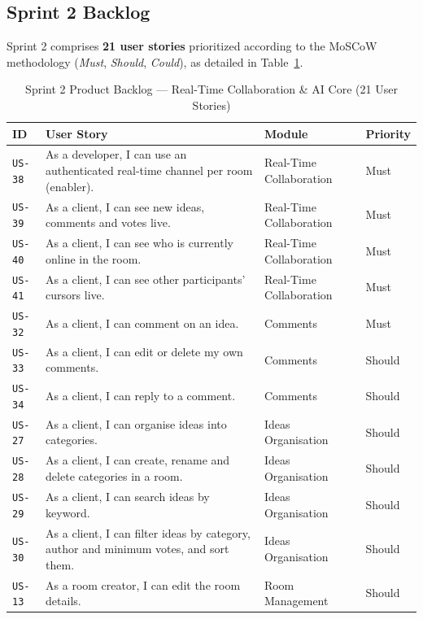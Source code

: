 \subsection{Sprint 2 Backlog}

Sprint 2 comprises \textbf{21 user stories} prioritized according to the MoSCoW methodology (\textit{Must}, \textit{Should}, \textit{Could}), as detailed in Table~\ref{tab:sprint2-backlog}.

\begin{table}[htbp]
\centering
\caption{Sprint 2 Product Backlog — Real-Time Collaboration \& AI Core (21 User Stories)}
\label{tab:sprint2-backlog}
\small
\begin{tabularx}{\textwidth}{@{} l X l l @{}}
\toprule
\textbf{ID} & \textbf{User Story} & \textbf{Module} & \textbf{Priority} \\
\midrule
\texttt{US-38} & As a developer, I can use an authenticated real-time channel per room (enabler). & Real-Time Collaboration & Must \\
\texttt{US-39} & As a client, I can see new ideas, comments and votes live. & Real-Time Collaboration & Must \\
\texttt{US-40} & As a client, I can see who is currently online in the room. & Real-Time Collaboration & Must \\
\texttt{US-41} & As a client, I can see other participants' cursors live. & Real-Time Collaboration & Must \\
\midrule
\texttt{US-32} & As a client, I can comment on an idea. & Comments & Must \\
\texttt{US-33} & As a client, I can edit or delete my own comments. & Comments & Should \\
\texttt{US-34} & As a client, I can reply to a comment. & Comments & Should \\
\midrule
\texttt{US-27} & As a client, I can organise ideas into categories. & Ideas Organisation & Should \\
\texttt{US-28} & As a client, I can create, rename and delete categories in a room. & Ideas Organisation & Should \\
\texttt{US-29} & As a client, I can search ideas by keyword. & Ideas Organisation & Should \\
\texttt{US-30} & As a client, I can filter ideas by category, author and minimum votes, and sort them. & Ideas Organisation & Should \\
\midrule
\texttt{US-13} & As a room creator, I can edit the room details. & Room Management & Should \\

\end{tabularx}
\end{table}
